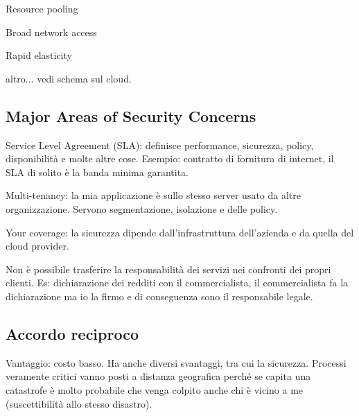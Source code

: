 Resource pooling

Broad network access

Rapid elasticity

altro... vedi schema sul cloud.

\subsection{Major Areas of Security Concerns}

Service Level Agreement (SLA): definisce performance, sicurezza, policy, 
disponibilità e molte altre cose. Esempio: contratto di fornitura di internet, 
il SLA di solito è la banda minima garantita.

Multi-tenancy: la mia applicazione è sullo stesso server usato da altre 
organizzazione. Servono segmentazione, isolazione e delle policy.

Your coverage: la sicurezza dipende dall'infrastruttura dell'azienda e da 
quella del cloud provider.

Non è possibile trasferire la responsabilità dei servizi nei confronti dei 
propri clienti. Es: dichiarazione dei redditi con il commercialista, il 
commercialista fa la dichiarazione ma io la firmo e di conseguenza sono il 
responsabile legale.

\subsection{Accordo reciproco}

Vantaggio: costo basso. Ha anche diversi svantaggi, tra cui la sicurezza.
Processi veramente critici vanno posti a distanza geografica perché se capita 
una catastrofe è molto probabile che venga colpito anche chi è vicino a me 
(suscettibilità allo stesso disastro).